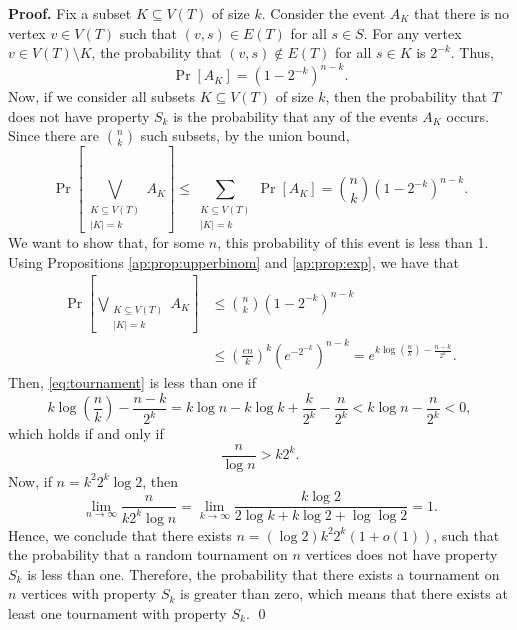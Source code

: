 \textbf{Proof. } Fix a subset $K \subseteq V(T)$ of size $k$. Consider the event $A_K$ that there is no vertex $v \in V(T)$ such that $(v, s) \in E(T)$ for all $s \in S$. For any vertex $v \in V(T) \setminus K$, the probability that $(v, s) \notin E(T)$ for all $s \in K$ is $2^{-k}$. Thus,
\[\Pr[A_K] = \left(1 - 2^{-k}\right)^{n - k}.\]
Now, if we consider all subsets $K \subseteq V(T)$ of size $k$, then the probability that $T$ does not have property $S_k$ is the probability that any of the events $A_K$ occurs. Since there are $\binom{n}{k}$ such subsets, by the union bound,
\[\Pr\left[\bigvee_{\substack{K \subseteq V(T) \\ |K| = k}} A_K\right] \leq \sum_{\substack{K \subseteq V(T) \\ |K| = k}}\Pr[A_K] = \binom{n}{k}\left(1 - 2^{-k}\right)^{n - k}.\]
We want to show that, for some $n$, this probability of this event is less than 1. Using Propositions \ref{ap:prop:upperbinom} and \ref{ap:prop:exp}, we have that
\begin{align}
    \Pr\left[\bigvee_{\substack{K \subseteq V(T) \\ |K| = k}} A_K\right] &\leq \binom{n}{k}\left(1 - 2^{-k}\right)^{n - k} \\
    &\leq \left(\frac{en}{k}\right)^k\left(e^{-2^{-k}}\right)^{n - k} = e^{k\log\left(\frac{n}{k}\right) - \frac{n - k}{2^k}}. \label{eq:tournament}
\end{align}
Then, \ref{eq:tournament} is less than one if 
\[k\log\left(\frac{n}{k}\right) - \frac{n - k}{2^k} = k\log n - k\log k + \frac{k}{2^k} - \frac{n}{2^k} < k\log n - \frac{n}{2^k} < 0,\]
which holds if and only if
\[\frac{n}{\log n} > k2^k.\]
Now, if $n = k^2 2^k\log 2$, then
\[\lim_{n \to \infty} \frac{n}{k2^k\log n} = \lim_{k \to \infty} \frac{k\log 2}{2\log k + k\log 2 + \log\log 2} = 1.\]
Hence, we conclude that there exists $n = (\log 2)k^2 2^k (1 + o(1))$, such that the probability that a random tournament on $n$ vertices does not have property $S_k$ is less than one. Therefore, the probability that there exists a tournament on $n$ vertices with property $S_k$ is greater than zero, which means that there exists at least one tournament with property $S_k$. \qed


